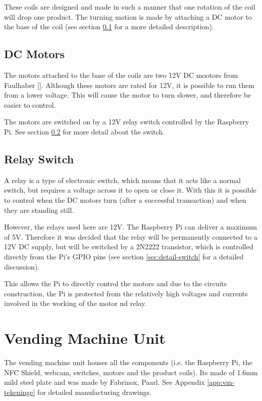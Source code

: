 These coils are designed and made in such a manner that one rotation of the coil will drop one
product. The turning motion is made by attaching a DC motor to the base of the coil (see
section \ref{sec:dc-motor} for a more detailed description).

\subsection{DC Motors}
\label{sec:dc-motor}

The motors attached to the base of the coils are two 12V DC mootors from Faulhaber
[\cite{manual:dc-motors}]. Although these motors are rated for 12V, it is possible to run them
from a lower voltage. This will cause the motor to turn slower, and therefore be easier to
control. 

The motors are switched on by a 12V relay switch controlled by the Raspberry Pi. See section
\ref{sec:relay-switch} for more detail about the switch.

\subsection{Relay Switch}
\label{sec:relay-switch}

A relay is a type of electronic switch, which means that it acts like a normal switch, but
requires a voltage across it to open or close it. With this it is possible to control when the
DC motors turn (after a successful transaction) and when they are standing still. 

However, the relays used here are 12V. The Raspberry Pi can deliver a maximum of 5V. Therefore
it was decided that the relay will be permanently connected to a 12V DC supply, but will be
switched by a 2N2222 transistor, which is controlled directly from the Pi's  GPIO pins (see
section \ref{sec:detail-switch} for a detailed discussion).

This allows the Pi to directly control the motors and due to the circuits construction, the Pi
is protected from the relatively high voltages and currents involved in the working of the
motor nd relay.

\section{Vending Machine Unit}

The vending machine unit houses all the components (i.e. the Raspberry Pi, the NFC Shield,
webcam, switches, motors and the product coils). Its made of 1.6mm mild steel plate and was
made by Fabrinox, Paarl. See Appendix \ref{app:vm-tekeninge} for detailed manufacturing
drawings.
